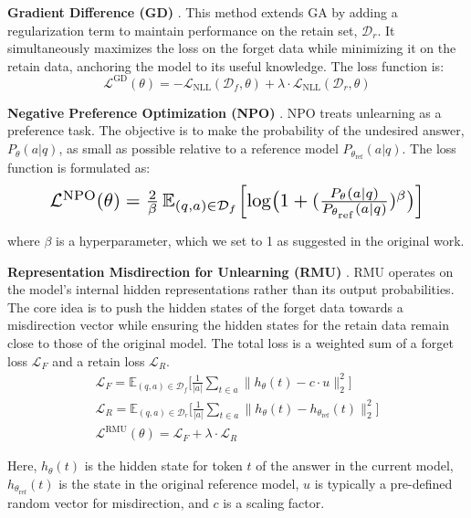 \textbf{Gradient Difference (GD)} \cite{liu2022continual}.
This method extends GA by adding a regularization term to maintain performance on the retain set, $\mathcal{D}_r$. It simultaneously maximizes the loss on the forget data while minimizing it on the retain data, anchoring the model to its useful knowledge. The loss function is:
\begin{equation}
\mathcal{L}^{\text{GD}}(\theta) = -\mathcal{L}_{\text{NLL}}(\mathcal{D}_f, \theta) + \lambda \cdot \mathcal{L}_{\text{NLL}}(\mathcal{D}_r, \theta)
\end{equation}

\textbf{Negative Preference Optimization (NPO)} \cite{zhangnegative}.
NPO treats unlearning as a preference task. The objective is to make the probability of the undesired answer, $P_{\theta}(a|q)$, as small as possible relative to a reference model $P_{\theta_{\text{ref}}}(a|q)$. The loss function is formulated as:
\begin{equation}
\resizebox{0.85\linewidth}{!}{$
  \mathcal{L}^{\mathrm{NPO}}(\theta)
    = \frac{2}{\beta}\,
      \mathbb{E}_{(q,a)\in\mathcal{D}_f}
      \Bigl[\log\bigl(1+(\tfrac{P_{\theta}(a\mid q)}{P_{\theta_{\mathrm{ref}}}(a\mid q)})^{\beta}\bigr)\Bigr]
$}
\end{equation}

where $\beta$ is a hyperparameter, which we set to 1 as suggested in the original work.

\textbf{Representation Misdirection for Unlearning (RMU)} \cite{li2024wmdp}.
RMU operates on the model's internal hidden representations rather than its output probabilities. The core idea is to push the hidden states of the forget data towards a misdirection vector while ensuring the hidden states for the retain data remain close to those of the original model. The total loss is a weighted sum of a forget loss $\mathcal{L}_F$ and a retain loss $\mathcal{L}_R$.
\begin{gather}
\mathcal{L}_F = \mathbb{E}_{(q,a) \in \mathcal{D}_f}
\Biggl[ \frac{1}{|a|} \sum_{t \in a} \bigl\| h_{\theta}(t) - c \cdot u \bigr\|_2^2 \Biggr] \\
\mathcal{L}_R = \mathbb{E}_{(q,a) \in \mathcal{D}_r}
\Biggl[ \frac{1}{|a|} \sum_{t \in a} \bigl\| h_{\theta}(t) - h_{\theta_{\text{ref}}}(t) \bigr\|_2^2 \Biggr] \\
\mathcal{L}^{\mathrm{RMU}}(\theta) = \mathcal{L}_F + \lambda \cdot \mathcal{L}_R
\end{gather}

Here, $h_{\theta}(t)$ is the hidden state for token $t$ of the answer in the current model, $h_{\theta_{\text{ref}}}(t)$ is the state in the original reference model, $u$ is typically a pre-defined random vector for misdirection, and $c$ is a scaling factor.



